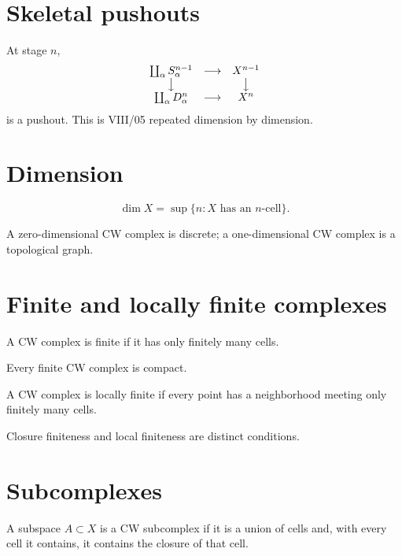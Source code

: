 \section{Skeletal pushouts}
At stage \(n\),
\[
\begin{array}{ccc}
\coprod_\alpha S^{n-1}_\alpha&\longrightarrow&X^{n-1}\\
\big\downarrow&&\big\downarrow\\
\coprod_\alpha D^n_\alpha&\longrightarrow&X^n
\end{array}
\]
is a pushout.  This is VIII/05 repeated dimension by dimension.

\section{Dimension}
\begin{definition}[Dimension]\label{def:viii06-dimension}
\[
\dim X=\sup\{n:X\text{ has an \(n\)-cell}\}.
\]
\end{definition}
A zero-dimensional CW complex is discrete; a one-dimensional CW complex is a
topological graph.

\section{Finite and locally finite complexes}
\begin{definition}\label{def:viii06-finite}
A CW complex is finite if it has only finitely many cells.
\end{definition}

\begin{proposition}\label{prop:viii06-compact}
Every finite CW complex is compact.
\end{proposition}

\begin{definition}\label{def:viii06-locally-finite}
A CW complex is locally finite if every point has a neighborhood meeting only
finitely many cells.
\end{definition}

\begin{warning}\label{warn:viii06-finiteness}
Closure finiteness and local finiteness are distinct conditions.
\end{warning}

\section{Subcomplexes}
\begin{definition}[Subcomplex]\label{def:viii06-subcomplex}
A subspace \(A\subset X\) is a CW subcomplex if it is a union of cells and,
with every cell it contains, it contains the closure of that cell.
\end{definition}

